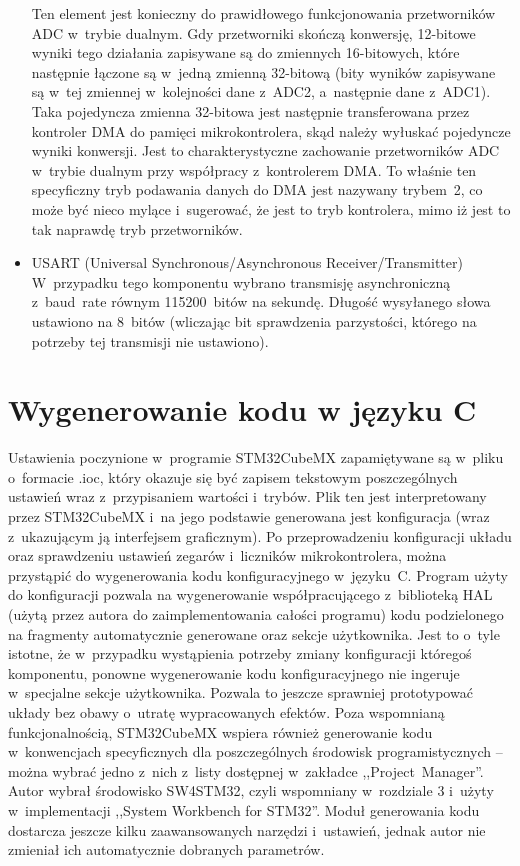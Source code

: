 \begin{itemize}
	Ten element jest konieczny do prawidłowego funkcjonowania przetworników ADC w~trybie dualnym. Gdy przetworniki skończą konwersję, 12-bitowe wyniki tego działania zapisywane są do zmiennych 16-bitowych, które następnie łączone są w~jedną zmienną 32-bitową (bity wyników zapisywane są w~tej zmiennej w~kolejności dane z~ADC2, a~następnie dane z~ADC1). Taka pojedyncza zmienna 32-bitowa jest następnie transferowana przez kontroler DMA do pamięci mikrokontrolera, skąd należy wyłuskać pojedyncze wyniki konwersji. Jest to charakterystyczne zachowanie przetworników ADC w~trybie dualnym przy współpracy z~kontrolerem DMA. To właśnie ten specyficzny tryb podawania danych do DMA jest nazywany trybem~2, co może być nieco mylące i~sugerować, że jest to tryb kontrolera, mimo iż jest to tak naprawdę tryb przetworników.
	\item USART (Universal Synchronous/Asynchronous Receiver/Transmitter)\\
	W~przypadku tego komponentu wybrano transmisję asynchroniczną z~baud~rate równym 115200~bitów na sekundę. Długość wysyłanego słowa ustawiono na 8~bitów (wliczając bit sprawdzenia parzystości, którego na potrzeby tej transmisji nie ustawiono).
\end{itemize}
\section{Wygenerowanie kodu w języku C}
\label{sec:configGenerate}
Ustawienia poczynione w~programie STM32CubeMX zapamiętywane są w~pliku o~formacie .ioc, który okazuje się być zapisem tekstowym poszczególnych ustawień wraz z~przypisaniem wartości i~trybów. Plik ten jest interpretowany przez STM32CubeMX i~na jego podstawie generowana jest konfiguracja (wraz z~ukazującym ją interfejsem graficznym). Po przeprowadzeniu konfiguracji układu oraz sprawdzeniu ustawień zegarów i~liczników mikrokontrolera, można przystąpić do wygenerowania kodu konfiguracyjnego w~języku~C. Program użyty do konfiguracji pozwala na wygenerowanie współpracującego z~biblioteką HAL (użytą przez autora do zaimplementowania całości programu) kodu podzielonego na fragmenty automatycznie generowane oraz sekcje użytkownika. Jest to o~tyle istotne, że w~przypadku wystąpienia potrzeby zmiany konfiguracji któregoś komponentu, ponowne wygenerowanie kodu konfiguracyjnego nie ingeruje w~specjalne sekcje użytkownika. Pozwala to jeszcze sprawniej prototypować układy bez obawy o~utratę wypracowanych efektów. Poza wspomnianą funkcjonalnością, STM32CubeMX wspiera również generowanie kodu w~konwencjach specyficznych dla poszczególnych środowisk programistycznych -- można wybrać jedno z~nich z~listy dostępnej w~zakładce ,,Project~Manager''. Autor wybrał środowisko SW4STM32, czyli wspomniany w~rozdziale 3 i~użyty w~implementacji ,,System Workbench for STM32''. Moduł generowania kodu dostarcza jeszcze kilku zaawansowanych narzędzi i~ustawień, jednak autor nie zmieniał ich automatycznie dobranych parametrów.